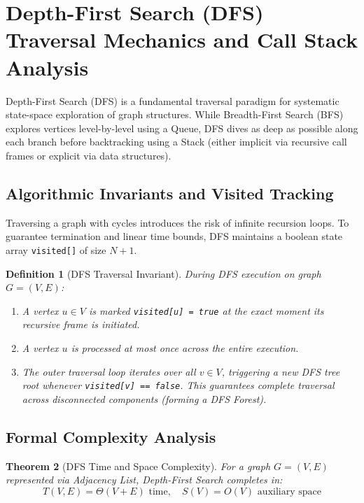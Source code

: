 \documentclass[10pt,journal,compsoc,onecolumn]{IEEEtran}
\newtheorem{theorem}{Theorem}
\newtheorem{definition}[theorem]{Definition}
\begin{document}
\section{Depth-First Search (DFS) Traversal Mechanics and Call Stack Analysis}
\label{sec:dfs}

Depth-First Search (DFS) is a fundamental traversal paradigm for systematic state-space exploration of graph structures. While Breadth-First Search (BFS) explores vertices level-by-level using a Queue, DFS dives as deep as possible along each branch before backtracking using a Stack (either implicit via recursive call frames or explicit via data structures).

\subsection{Algorithmic Invariants and Visited Tracking}

Traversing a graph with cycles introduces the risk of infinite recursion loops. To guarantee termination and linear time bounds, DFS maintains a boolean state array \texttt{visited[]} of size $N+1$.

\begin{definition}[DFS Traversal Invariant]
During DFS execution on graph $G = (V, E)$:
\begin{enumerate}
    \item A vertex $u \in V$ is marked \texttt{visited[u] = true} at the exact moment its recursive frame is initiated.
    \item A vertex $u$ is processed at most once across the entire execution.
    \item The outer traversal loop iterates over all $v \in V$, triggering a new DFS tree root whenever \texttt{visited[v] == false}. This guarantees complete traversal across disconnected components (forming a \emph{DFS Forest}).
\end{enumerate}
\end{definition}

\subsection{Formal Complexity Analysis}

\begin{theorem}[DFS Time and Space Complexity]
\label{thm:dfs_complexity}
For a graph $G = (V, E)$ represented via Adjacency List, Depth-First Search completes in:
\begin{equation}
T(V, E) = \Theta(V + E) \text{ time}, \quad S(V) = O(V) \text{ auxiliary space}
\end{equation}
\end{theorem}
\end{document}
